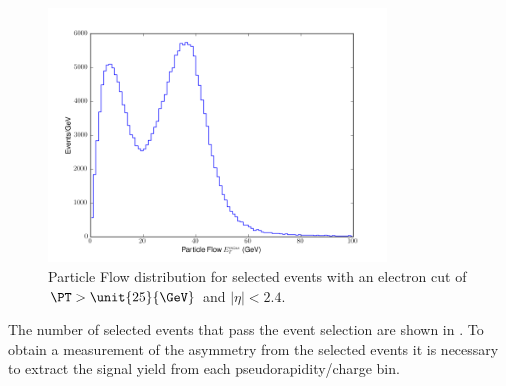 \begin{figure}[htbp]
  \begin{center}
    \includegraphics*[width=0.8\textwidth]{pfmet_dist}
    \caption[Particle Flow \ETm distribution for selected events.]{Particle Flow
\ETm distribution for selected events with an electron cut of $\PT >
\unit{25}{\GeV}$ and $|\eta| < 2.4$\cite{baisini2010electron}.\label{fig:pfmet_dist_36}}
  \end{center}
\end{figure}

The number of selected events that pass the
event selection are shown in . To obtain a
measurement of the asymmetry from the selected events it is necessary to extract
the signal yield from each pseudorapidity/charge bin.

